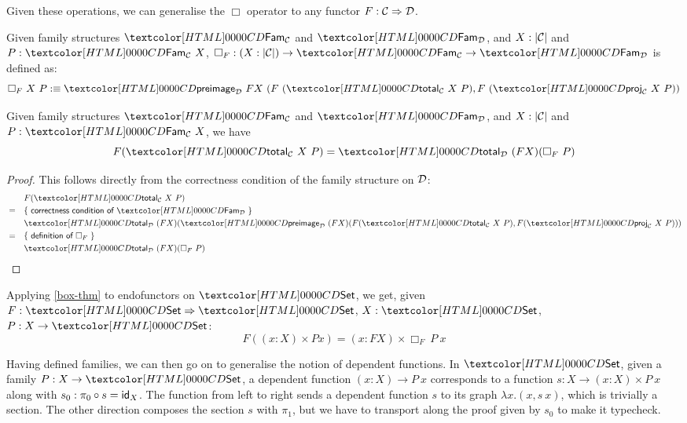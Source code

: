 Given these operations, we can generalise the $\Box$ operator to any
functor $F : \mathcal{C} \Rightarrow \mathcal{D}$.

\begin{definition}
  Given family structures $\Fam_{\Cc}$ and $\Fam_{\Dd}$, and
  $X : | \mathcal{C} |$ and $P : \Fam_{\Cc}\ X$,
  $\Box_F : (X : | \Cc |) \to \Fam_{\Cc} \to \Fam_{\Dd}$ is defined
  as:
  $$
  \Box_F\ X\ P \ddefeq \preimage_{\Dd}\ FX\ (F\ (\total_{\Cc}\ X\ P) ,
  F\ (\proj_{\Cc}\ X\ P))
  $$
\end{definition}

\begin{proposition}
  \label{box-thm}
  Given family structures $\Fam_{\Cc}$ and $\Fam_{\Dd}$, and
  $X : | \mathcal{C} |$ and $P : \Fam_{\Cc}\ X$, we have
  $$
  F (\total_{\Cc}\ X\ P) = \total_{\Dd}\ (F X) (\Box_F\ P)
  $$
\end{proposition}

\begin{proof}
  This follows directly from the correctness condition of the family
  structure on $\mathcal{D}$:
  \begin{align*}
    &&&F (\total_{\Cc}\ X\ P) \\
    &=& &\reasontext{correctness condition of $\Fam_{\Dd}$} \\
    &&&\total_{\Dd}\ (F X) (\preimage_{\Dd}\ (F X) (F (\total_{\Cc}\ X\ P), F (\proj_{\Cc}\ X\ P))) \\
    &=& &\reasontext{definition of $\Box_F$} \\
    &&&\total_{\Dd}\ (F X) (\Box_F\ P)
  \end{align*}
\end{proof}

\begin{corollary}
  Applying \cref{box-thm} to endofunctors on $\Set$, we get, given
  $F : \Func{\Set}{\Set}$, $X : \Set$, $P : X \to \Set$:
  $$
  F ((x : X) \times P x) = (x : FX) \times \Box_F\ P\ x
  $$
\end{corollary}

Having defined families, we can then go on to generalise the notion of
dependent functions. In $\Set$, given a family $P : X \to \Set$, a
dependent function $(x : X) \to P\ x$ corresponds to a function
$s : X \to (x : X) \times P\ x$ along with
$s_0 : \pi_0 \circ s = \mathsf{id}_X$. The function from left to right sends a
dependent function $s$ to its graph $\lambda x . (x , s\ x)$, which is
trivially a section. The other direction composes the section $s$ with
$\pi_1$, but we have to transport along the proof given by $s_0$ to
make it typecheck.

